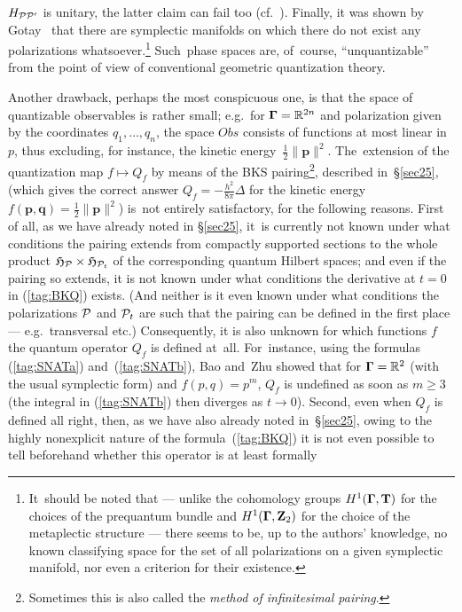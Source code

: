 \documentclass[11pt]{amsart}
\numberwithin{equation}{section}
\theoremstyle{remark}
\newcommand\TT{{\bold T}}
\newcommand\Obs{Obs}
\newcommand\Omg{{\bigam}}   %
\newcommand\PP{{\Cal P}}
\newcommand\ZZ{\bold Z}
\newcommand\GG{{\PP'}}
\newcommand\HH{\mathfrak H}
\newcommand\RR{\mathbb R}
\newcommand{\bigam}{\mbox{\boldmath $\Gamma$}}
\newcommand{\bp}{\mathbf p}
\newcommand{\bq}{\mathbf q}
\begin{document}
$H_{\PP\GG}$ is unitary, the latter claim can fail too (cf.~\cite{bib:TuyGBK}).
Finally, it was shown by Gotay~\cite{bib:Gotay} that there are symplectic
manifolds on which there do not exist any polarizations
whatsoever.\footnote{It~should be noted that --- unlike the cohomology groups
$H^1(\Omg,\TT)$ for the choices of the prequantum bundle and $H^1(\Omg,\ZZ_2)$
for the choice of the metaplectic structure --- there seems to be, up to the
authors' knowledge, no known classifying space for the set of all polarizations
on a given symplectic manifold, nor even a criterion for their existence.}
Such~phase spaces are, of~course, ``unquantizable'' from the point of view of
conventional geometric quantization theory.

Another drawback, perhaps the most conspicuous one, is that the space of
quantizable observables is rather small; e.g.~for $\Omg=\RR^{2n}$ and
polarization given by the coordinates $q_1,\dots,q_n$, the space $\Obs$
consists of functions at most linear
in~$p$, thus excluding, for instance, the kinetic energy~$\frac12\|\bp\|^2$.
The~extension of the quantization map $f\mapsto Q_f$ by means of the BKS
pairing\footnote{Sometimes this is also called the {\sl method of infinitesimal
pairing\/}.}, described in~\S\ref{sec25}, (which gives the correct answer
$Q_f=-\frac{h^2}{8\pi}\Delta$ for the kinetic energy
$f(\bp,\bq)=\frac12\|\bp\|^2$) is~not entirely satisfactory, for the following
reasons. First of all, as we have already noted in \S\ref{sec25}, it~is
currently not known under what conditions the pairing extends from compactly
supported sections to the whole product $\HH_\PP\times\HH_{\PP_t}$ of the
corresponding quantum Hilbert spaces; and even if the pairing so extends, it is
not known under what conditions the derivative at $t=0$ in (\ref{tag:BKQ})
exists. (And neither is it even known under what conditions the polarizations
$\PP$ and $\PP_t$ are such that the pairing can be defined in the first place
--- e.g.~transversal etc.) Consequently, it is also unknown for which functions
$f$ the quantum operator $Q_f$ is defined at~all. For~instance, using the
formulas (\ref{tag:SNATa}) and~(\ref{tag:SNATb}), Bao and~Zhu
\cite{bib:BaoZnew} showed that for $\Omg=\RR^{2}$ (with the usual symplectic
form) and $f(p,q)=p^m$, $Q_f$ is undefined as soon as $m\ge3$ (the integral in
(\ref{tag:SNATb}) then diverges as $t\to0$). Second, even when $Q_f$ is defined
all right, then, as we have also already noted in~\S\ref{sec25}, owing to the
highly nonexplicit nature of the formula~(\ref{tag:BKQ}) it is not even
possible to tell beforehand whether this operator is at least formally
\end{document}
